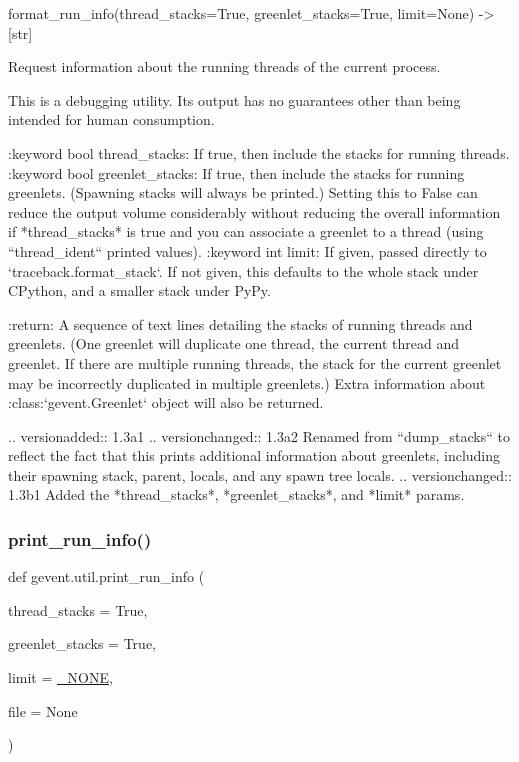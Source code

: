 \begin{DoxyVerb}format_run_info(thread_stacks=True, greenlet_stacks=True, limit=None) -> [str]

Request information about the running threads of the current process.

This is a debugging utility. Its output has no guarantees other than being
intended for human consumption.

:keyword bool thread_stacks: If true, then include the stacks for
   running threads.
:keyword bool greenlet_stacks: If true, then include the stacks for
   running greenlets. (Spawning stacks will always be printed.)
   Setting this to False can reduce the output volume considerably
   without reducing the overall information if *thread_stacks* is true
   and you can associate a greenlet to a thread (using ``thread_ident``
   printed values).
:keyword int limit: If given, passed directly to `traceback.format_stack`.
   If not given, this defaults to the whole stack under CPython, and a
   smaller stack under PyPy.

:return: A sequence of text lines detailing the stacks of running
        threads and greenlets. (One greenlet will duplicate one thread,
        the current thread and greenlet. If there are multiple running threads,
        the stack for the current greenlet may be incorrectly duplicated in multiple
        greenlets.)
        Extra information about
        :class:`gevent.Greenlet` object will also be returned.

.. versionadded:: 1.3a1
.. versionchanged:: 1.3a2
   Renamed from ``dump_stacks`` to reflect the fact that this
   prints additional information about greenlets, including their
   spawning stack, parent, locals, and any spawn tree locals.
.. versionchanged:: 1.3b1
   Added the *thread_stacks*, *greenlet_stacks*, and *limit* params.
\end{DoxyVerb}
 \mbox{\label{namespacegevent_1_1util_a5e6c937d41783b4b331bf067bb66575d}} 
\subsubsection{\texorpdfstring{print\+\_\+run\+\_\+info()}{print\_run\_info()}}
{\footnotesize\ttfamily def gevent.\+util.\+print\+\_\+run\+\_\+info (\begin{DoxyParamCaption}\item[{}]{thread\+\_\+stacks = {\ttfamily True},  }\item[{}]{greenlet\+\_\+stacks = {\ttfamily True},  }\item[{}]{limit = {\ttfamily \hyperlink{classgevent_1_1__util_1_1___n_o_n_e}{\+\_\+\+N\+O\+NE}},  }\item[{}]{file = {\ttfamily None} }\end{DoxyParamCaption})}

